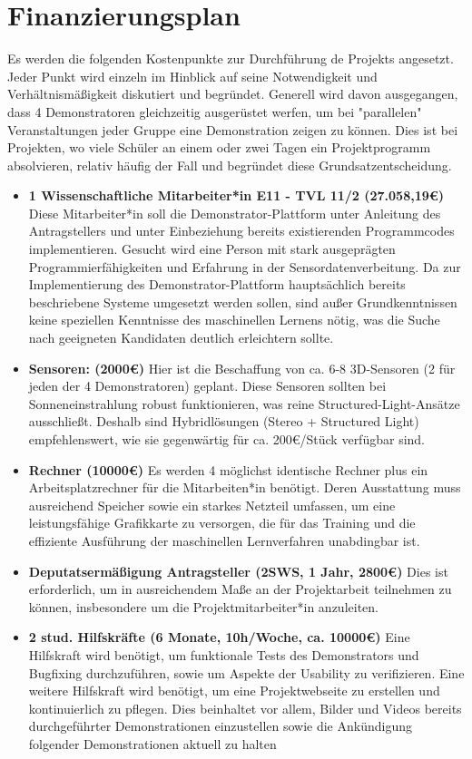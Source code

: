 \documentclass[11pt]{article}
\begin{document}
\section{Finanzierungsplan}
Es werden die folgenden Kostenpunkte zur Durchführung de Projekts angesetzt. Jeder Punkt wird einzeln im Hinblick auf seine Notwendigkeit und Verhältnismäßigkeit
diskutiert und begründet. Generell wird davon ausgegangen, dass 4 Demonstratoren gleichzeitig ausgerüstet werfen, um bei "parallelen" Veranstaltungen jeder Gruppe eine Demonstration zeigen zu können. Dies ist bei Projekten, wo viele Schüler an einem oder zwei Tagen ein Projektprogramm absolvieren, relativ häufig der Fall und begründet diese Grundsatzentscheidung.
\begin{itemize}
\item \textbf{1 Wissenschaftliche Mitarbeiter*in E11 - TVL 11/2 (27.058,19\euro)} Diese Mitarbeiter*in soll die Demonstrator-Plattform unter Anleitung des Antragstellers und unter Einbeziehung bereits existierenden Programmcodes implementieren. Gesucht wird eine Person mit stark ausgeprägten Programmierfähigkeiten und Erfahrung in der Sensordatenverbeitung. Da
zur Implementierung des Demonstrator-Plattform hauptsächlich bereits beschriebene Systeme umgesetzt werden sollen, sind außer Grundkenntnissen keine speziellen Kenntnisse des maschinellen Lernens nötig, was die Suche nach geeigneten Kandidaten deutlich erleichtern sollte.
\item \textbf{Sensoren: (2000\euro)} Hier ist die Beschaffung von ca. 6-8 3D-Sensoren (2 für jeden der 4 Demonstratoren) geplant. Diese Sensoren sollten bei Sonneneinstrahlung robust funktionieren, was reine Structured-Light-Ansätze ausschließt. Deshalb sind Hybridlösungen (Stereo + Structured Light) empfehlenswert, wie sie gegenwärtig für ca. 200\euro/Stück verfügbar sind.
\item \textbf{Rechner (10000\euro)} Es werden 4 möglichst identische Rechner plus ein Arbeitsplatzrechner für die Mitarbeiten*in benötigt. Deren Ausstattung muss ausreichend Speicher sowie ein starkes Netzteil umfassen, um eine leistungsfähige Grafikkarte zu versorgen, die für das Training und die effiziente Ausführung der maschinellen Lernverfahren unabdingbar ist.
\item \textbf{Deputatsermäßigung Antragsteller (2SWS, 1 Jahr, 2800\euro)} Dies ist erforderlich, um in ausreichendem Maße an der Projektarbeit teilnehmen zu können, insbesondere um die Projektmitarbeiter*in anzuleiten.
\item \textbf{2 stud. Hilfskräfte (6 Monate, 10h/Woche, ca. 10000\euro)} Eine Hilfskraft wird benötigt, um funktionale Tests des Demonstrators und Bugfixing durchzuführen, sowie um Aspekte der Usability zu verifizieren. Eine weitere Hilfskraft wird benötigt, um eine Projektwebseite zu erstellen und kontinuierlich zu pflegen. Dies beinhaltet vor allem, Bilder und Videos bereits durchgeführter Demonstrationen einzustellen sowie die Ankündigung folgender Demonstrationen aktuell zu halten
\end{itemize}
\end{document}
